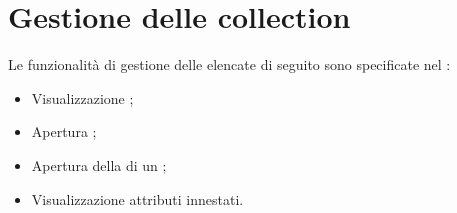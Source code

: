 \clearpage
\section{Gestione delle collection}
Le funzionalità di gestione delle  elencate di seguito sono specificate nel \ManualeUtente{}:
	\begin{itemize}
		\item Visualizzazione ;
		\item Apertura ;
		\item Apertura della  di un ;
		\item Visualizzazione  attributi innestati.
	\end{itemize}
	

